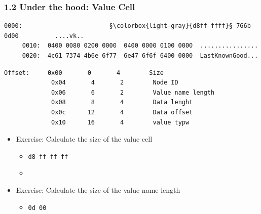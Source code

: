 \begin{frame}[fragile]
  \frametitle{1.2 Under the hood: Value Cell}
  \begin{lstlisting}[basicstyle=\tiny,escapechar=§]
     0000:                        §\colorbox{light-gray}{d8ff ffff}§ 766b 0d00          ....vk..
     0010:  0400 0080 0200 0000  0400 0000 0100 0000  ................
     0020:  4c61 7374 4b6e 6f77  6e47 6f6f 6400 0000  LastKnownGood...
  \end{lstlisting}
  \begin{lstlisting}[basicstyle=\tiny]
 Offset:     0x00       0       4        Size
             0x04       4       2        Node ID
             0x06       6       2        Value name length
             0x08       8       4        Data lenght
             0x0c      12       4        Data offset
             0x10      16       4        value typw
  \end{lstlisting}
  \begin{itemize}
      \item Exercise: Calculate the size of the value cell
      \begin{itemize}
          \item[] \texttt{d8 ff ff ff}
          \item[]
      \end{itemize}
      \item Exercise: Calculate the size of the value name length
      \begin{itemize}
          \item[] \texttt{0d 00}
      \end{itemize}
  \end{itemize}
\end{frame}



